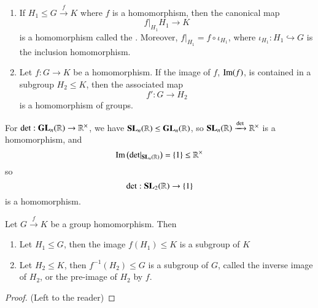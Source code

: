 \begin{remark}
    \leavevmode
    \begin{enumerate}
        \item If $H_1 \leq G\xrightarrow{f} K$ where $f$ is a homomorphism, then the canonical map \begin{equation}
            f\rvert_{H_1}H_1\rightarrow K
        \end{equation}
        is a homomorphism called the . Moreover, $f\rvert_{H_1} = f \circ \iota_{H_1}$, where $\iota_{H_1}:H_1\hookrightarrow G$ is the inclusion homomorphism.
        \item Let $f:G\rightarrow K$ be a homomorphism. If the image of $f$, $\operatorname{Im}(f)$, is contained in a subgroup $H_2 \leq K$, then the associated map \begin{equation}
            f':G\rightarrow H_2
        \end{equation}
        is a homomorphism of groups.
    \end{enumerate}
\end{remark}

\begin{example}
    For $\det:\mathbf{GL}_n(\mathbb R)\rightarrow \mathbb R^{\times}$, we have $\mathbf{SL}_n(\mathbb R) \leq \mathbf{GL}_n(\mathbb R)$, so $\mathbf{SL}_n(\mathbb R)\xrightarrow{\det}\mathbb R^{\times}$ is a homomorphism, and \begin{equation}
        \operatorname{Im}\left(\det\rvert_{\mathbf{SL}_n(\mathbb R)}\right) = \{1\} \leq \mathbb R^{\times}
    \end{equation}
    so \begin{equation}
        \det:\mathbf{SL}_2(\mathbb R)\rightarrow \{1\}
    \end{equation}
    is a homomorphism.
\end{example}


\begin{proposition}
    Let $G\xrightarrow{f} K$ be a group homomorphism. Then \begin{enumerate}
        \item Let $H_1 \leq G$, then the image $f(H_1) \leq K$ is a subgroup of $K$
        \item Let $H_2 \leq K$, then $f^{-1}(H_2) \leq G$ is a subgroup of $G$, called the inverse image of $H_2$, or the pre-image of $H_2$ by $f$.
    \end{enumerate}
\end{proposition}
\begin{proof}
    (Left to the reader)
\end{proof}


